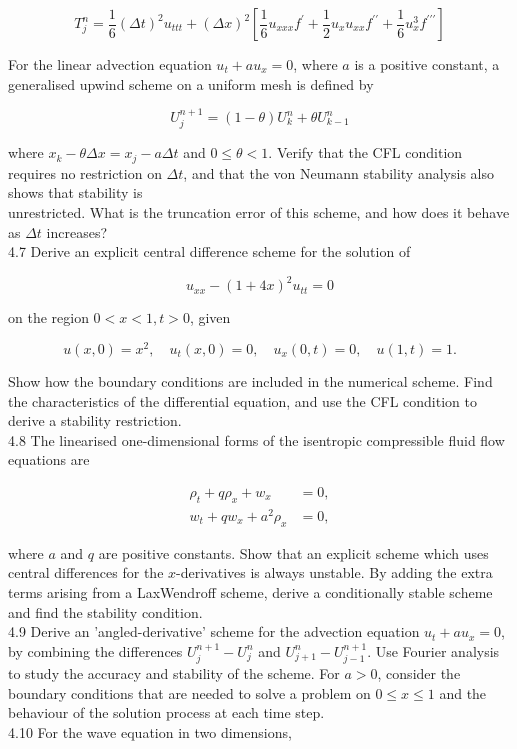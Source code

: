 \documentclass[10pt]{article}
\begin{document}
\[
T_{j}^{n}=\frac{1}{6}(\Delta t)^{2} u_{t t t}+(\Delta x)^{2}\left[\frac{1}{6} u_{x x x} f^{\prime}+\frac{1}{2} u_{x} u_{x x} f^{\prime \prime}+\frac{1}{6} u_{x}^{3} f^{\prime \prime \prime}\right]
\]

For the linear advection equation \(u_{t}+a u_{x}=0\), where \(a\) is a positive constant, a generalised upwind scheme on a uniform mesh is defined by

\[
U_{j}^{n+1}=(1-\theta) U_{k}^{n}+\theta U_{k-1}^{n}
\]

where \(x_{k}-\theta \Delta x=x_{j}-a \Delta t\) and \(0 \leq \theta<1\). Verify that the CFL condition requires no restriction on \(\Delta t\), and that the von Neumann stability analysis also shows that stability is\\
unrestricted. What is the truncation error of this scheme, and how does it behave as \(\Delta t\) increases?\\
4.7 Derive an explicit central difference scheme for the solution of

\[
u_{x x}-(1+4 x)^{2} u_{t t}=0
\]

on the region \(0<x<1, t>0\), given

\[
u(x, 0)=x^{2}, \quad u_{t}(x, 0)=0, \quad u_{x}(0, t)=0, \quad u(1, t)=1 .
\]

Show how the boundary conditions are included in the numerical scheme. Find the characteristics of the differential equation, and use the CFL condition to derive a stability restriction.\\
4.8 The linearised one-dimensional forms of the isentropic compressible fluid flow equations are

\[
\begin{aligned}
\rho_{t}+q \rho_{x}+w_{x} & =0, \\
w_{t}+q w_{x}+a^{2} \rho_{x} & =0,
\end{aligned}
\]

where \(a\) and \(q\) are positive constants. Show that an explicit scheme which uses central differences for the \(x\)-derivatives is always unstable. By adding the extra terms arising from a LaxWendroff scheme, derive a conditionally stable scheme and find the stability condition.\\
4.9 Derive an 'angled-derivative' scheme for the advection equation \(u_{t}+a u_{x}=0\), by combining the differences \(U_{j}^{n+1}-U_{j}^{n}\) and \(U_{j+1}^{n}- U_{j-1}^{n+1}\). Use Fourier analysis to study the accuracy and stability of the scheme. For \(a>0\), consider the boundary conditions that are needed to solve a problem on \(0 \leq x \leq 1\) and the behaviour of the solution process at each time step.\\
4.10 For the wave equation in two dimensions,
\end{document}
